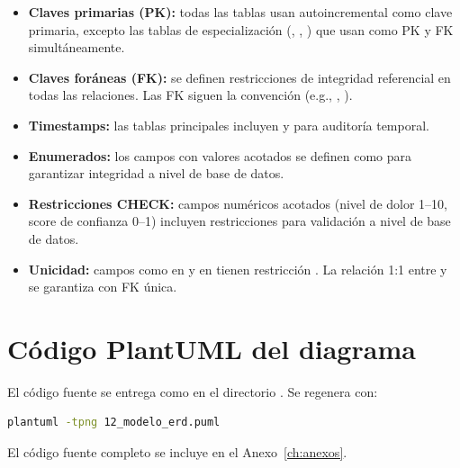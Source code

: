 \begin{itemize}
  \item \textbf{Claves primarias (PK):} todas las tablas usan  autoincremental como clave primaria, excepto las tablas de especialización (, , ) que usan  como PK y FK simultáneamente.

  \item \textbf{Claves foráneas (FK):} se definen restricciones de integridad referencial en todas las relaciones. Las FK siguen la convención  (e.g., , ).

  \item \textbf{Timestamps:} las tablas principales incluyen  y  para auditoría temporal.

  \item \textbf{Enumerados:} los campos con valores acotados se definen como  para garantizar integridad a nivel de base de datos.

  \item \textbf{Restricciones CHECK:} campos numéricos acotados (nivel de dolor 1--10, score de confianza 0--1) incluyen restricciones  para validación a nivel de base de datos.

  \item \textbf{Unicidad:} campos como  en  y  en  tienen restricción . La relación 1:1 entre  y  se garantiza con FK única.
\end{itemize}

\section{Código PlantUML del diagrama}

El código fuente se entrega como  en el directorio . Se regenera con:

\begin{lstlisting}[language=bash]
plantuml -tpng 12_modelo_erd.puml
\end{lstlisting}

El código fuente completo se incluye en el Anexo~\ref{ch:anexos}.
